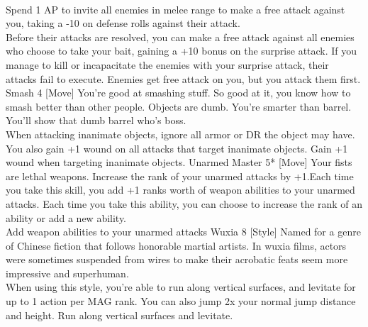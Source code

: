 \begin{path}
{\\Spend 1 AP to invite all enemies in melee range to make a free attack against you, taking a -10 on defense rolls against their attack.
\\Before their attacks are resolved, you can make a free attack against all enemies who choose to take your bait, gaining a +10 bonus on the surprise attack. If you manage to kill or incapacitate the enemies with your surprise attack, their attacks fail to execute.}
{Enemies get free attack on you, but you attack them first.}
\skilldescription
{Smash}
{4}
[Move]
{You're good at smashing stuff. So good at it, you know how to smash better than other people. Objects are dumb. You're smarter than barrel. You'll show that dumb barrel who's boss.
\\When attacking inanimate objects, ignore all armor or DR the object may have. You also gain +1 wound on all attacks that target inanimate objects.}
{Gain +1 wound when targeting inanimate objects.}
\skilldescription
{Unarmed Master}
{5*}
[Move]
{Your fists are lethal weapons. Increase the rank of your unarmed attacks by +1.Each time you take this skill, you add +1 ranks worth of weapon abilities to your unarmed attacks. Each time you take this ability, you can choose to increase the rank of an ability or add a new ability.\\
}
{Add weapon abilities to your unarmed attacks}
\skilldescription
{Wuxia}
{8}
[Style]
{Named for a genre of Chinese fiction that follows honorable martial artists. In wuxia films, actors were sometimes suspended from wires to make their acrobatic feats seem more impressive and superhuman.
\\When using this style, you're able to run along vertical surfaces, and levitate for up to 1 action per MAG rank. You can also jump 2x your normal jump distance and height.}
{Run along vertical surfaces and levitate.}

\end{path}
